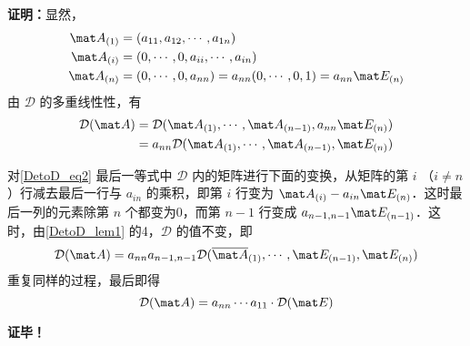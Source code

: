 \textbf{证明：}显然，
\begin{equation}
\begin{aligned}
\mat A_{(1)}&=(a_{11},a_{12},\cdots,a_{1n})\\
\mat A_{(i)}&=(0,\cdots,0,a_{ii},\cdots,a_{in})\\
\mat A_{(n)}&=(0,\cdots,0,a_{nn})=a_{nn}(0,\cdots,0,1)=a_{nn}\mat E_{(n)}
\end{aligned}
\end{equation}
由 $\mathcal D$ 的多重线性性，有
\begin{equation}\label{DetoD_eq2}
\begin{aligned}
\mathcal D(\mat A)&=\mathcal D(\mat A_{(1)},\cdots,\mat A_{(n-1)},a_{nn}\mat E_{(n)})\\
&=a_{nn}\mathcal D(\mat A_{(1)},\cdots,\mat A_{(n-1)},\mat E_{(n)})
\end{aligned}
\end{equation}

对\autoref{DetoD_eq2} 最后一等式中 $\mathcal D$ 内的矩阵进行下面的变换，从矩阵的第 $i$ （$i\neq n$）行减去最后一行与 $a_{in}$ 的乘积，即第 $i$ 行变为 $\mat A_{(i)}-a_{in}\mat E_{(n)}$．这时最后一列的元素除第 $n$ 个都变为0，而第 $n-1$ 行变成 $a_{n-1,n-1}\mat E_{(n-1)}$．这时，由\autoref{DetoD_lem1} 的4，$\mathcal D$ 的值不变，即
\begin{equation}
\mathcal D(\mat A)=a_{nn}a_{n-1,n-1}\mathcal D(\overline{\mat A}_{(1)},\cdots,\mat E_{(n-1)},\mat E_{(n)})
\end{equation}
重复同样的过程，最后即得
\begin{equation}
\mathcal D(\mat A)=a_{nn}\cdots a_{11}\cdot \mathcal D(\mat E)
\end{equation}

\textbf{证毕！}